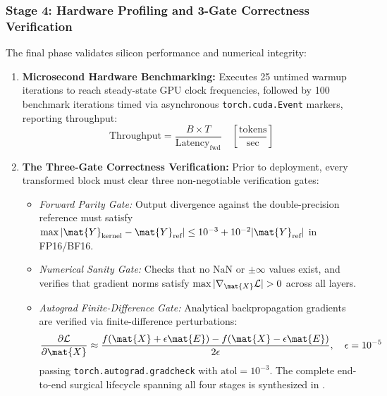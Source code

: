 \subsubsection{Stage 4: Hardware Profiling and 3-Gate Correctness Verification}
\label{subsec:correctness_gates}
The final phase validates silicon performance and numerical integrity:
\begin{enumerate}
    \item \textbf{Microsecond Hardware Benchmarking:} Executes 25 untimed warmup iterations to reach steady-state GPU clock frequencies, followed by 100 benchmark iterations timed via asynchronous \texttt{torch.cuda.Event} markers, reporting throughput:
    \begin{equation}
        \text{Throughput} = \frac{B \times T}{\text{Latency}_{\text{fwd}}} \quad \left[\frac{\text{tokens}}{\text{sec}}\right]
        \label{eq:throughput_metric}
    \end{equation}
    \item \textbf{The Three-Gate Correctness Verification:} Prior to deployment, every transformed block must clear three non-negotiable verification gates:
    \begin{itemize}
        \item \textit{Forward Parity Gate:} Output divergence against the double-precision reference must satisfy $\max |\mat{Y}_{\text{kernel}} - \mat{Y}_{\text{ref}}| \le 10^{-3} + 10^{-2} |\mat{Y}_{\text{ref}}|$ in FP16/BF16.
        \item \textit{Numerical Sanity Gate:} Checks that no $\text{NaN}$ or $\pm\infty$ values exist, and verifies that gradient norms satisfy $\max |\nabla_{\mat{X}} \mathcal{L}| > 0$ across all layers.
        \item \textit{Autograd Finite-Difference Gate:} Analytical backpropagation gradients are verified via finite-difference perturbations:
        \begin{equation}
            \frac{\partial \mathcal{L}}{\partial \mat{X}} \approx \frac{f(\mat{X} + \epsilon \mat{E}) - f(\mat{X} - \epsilon \mat{E})}{2\epsilon}, \quad \epsilon = 10^{-5}
            \label{eq:finite_diff_grad}
        \end{equation}
        passing \texttt{torch.autograd.gradcheck} with $\text{atol}=10^{-3}$. The complete end-to-end surgical lifecycle spanning all four stages is synthesized in .
    \end{itemize}
\end{enumerate}

